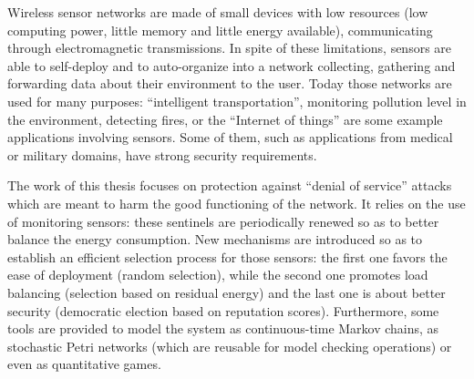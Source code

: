 Wireless sensor networks are made of small devices with low resources (low computing power, little memory and little energy available), communicating through electromagnetic transmissions.
In spite of these limitations, sensors are able to self-deploy and to auto-organize into a network collecting, gathering and forwarding data about their environment to the user.
Today those networks are used for many purposes: “intelligent transportation”, monitoring pollution level in the environment, detecting fires, or the “Internet of things” are some example applications involving sensors.
Some of them, such as applications from medical or military domains, have strong security requirements.

The work of this thesis focuses on protection against “denial of service” attacks which are meant to harm the good functioning of the network.
It relies on the use of monitoring sensors: these sentinels are periodically renewed so as to better balance the energy consumption.
New mechanisms are introduced so as to establish an efficient selection process for those sensors: the first one favors the ease of deployment (random selection), while the second one promotes load balancing (selection based on residual energy) and the last one is about better security (democratic election based on reputation scores).
Furthermore, some tools are provided to model the system as continuous-time Markov chains, as stochastic Petri networks (which are reusable for model checking operations) or even as quantitative games.

